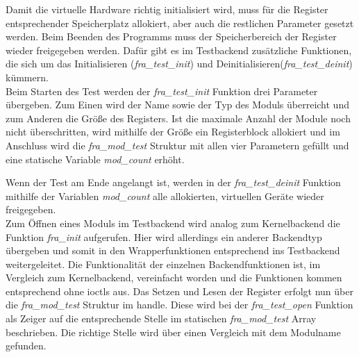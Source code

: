 Damit die virtuelle Hardware richtig initialisiert wird, muss für die Register entsprechender Speicherplatz allokiert, aber auch die restlichen Parameter gesetzt werden. Beim Beenden des Programms muss der Speicherbereich der Register wieder freigegeben werden. Dafür gibt es im Testbackend zusätzliche Funktionen, die sich um das Initialisieren (\textit{fra\_test\_init}) und Deinitialisieren(\textit{fra\_test\_deinit}) kümmern.\\

 
Beim Starten des Test werden der \textit{fra\_test\_init} Funktion drei Parameter übergeben. Zum Einen wird der Name sowie der Typ des Moduls überreicht und zum Anderen die Größe des Registers. Ist die maximale Anzahl der Module noch nicht überschritten, wird mithilfe der Größe ein Registerblock allokiert und im Anschluss wird die \textit{fra\_mod\_test} Struktur mit allen vier Parametern gefüllt und eine statische Variable \textit{mod\_count} erhöht.

Wenn der Test am Ende angelangt ist, werden in der \textit{fra\_test\_deinit} Funktion mithilfe der Variablen \textit{mod\_count} alle allokierten, virtuellen Geräte wieder freigegeben.\\


Zum Öffnen eines Moduls im Testbackend wird analog zum Kernelbackend die Funktion \textit{fra\_init} aufgerufen. Hier wird allerdings ein anderer Backendtyp übergeben und somit in den Wrapperfunktionen entsprechend ins Testbackend weitergeleitet. 
Die Funktionalität der einzelnen Backendfunktionen ist, im Vergleich zum Kernelbackend, vereinfacht worden und die Funktionen kommen entsprechend ohne \ac{ioctl}s aus. Das Setzen und Lesen der Register erfolgt nun über die \textit{fra\_mod\_test} Struktur im \gls{handle}. Diese wird bei der \textit{fra\_test\_open} Funktion als Zeiger auf die entsprechende Stelle im statischen \textit{fra\_mod\_test} Array beschrieben. Die richtige Stelle wird über einen Vergleich mit dem Modulname gefunden.\\



